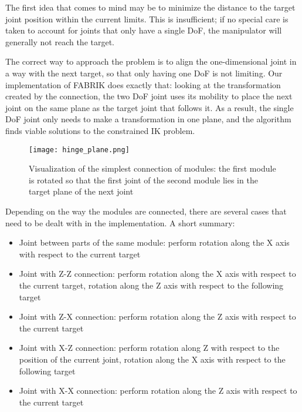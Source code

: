 The first idea that comes to mind may be to minimize the distance to the target joint position within the current limits. This is insufficient; if no special care is taken to account for joints that only have a single DoF, the manipulator will generally not reach the target.

The correct way to approach the problem is to align the one-dimensional joint in a way with the next target, so that only having one DoF is not limiting. Our implementation of FABRIK does exactly that: looking at the transformation created by the connection, the two DoF joint uses its mobility to place the next joint on the same plane as the target joint that follows it. As a result, the single DoF joint only needs to make a transformation in one plane, and the algorithm finds viable solutions to the constrained IK problem.

\begin{figure}[h]
    \centering
    \begin{minipage}{.6\textwidth}
        \texttt{[image: hinge\_plane.png]}
    \end{minipage}
    \caption{Visualization of the simplest connection of modules: the first module is rotated so that the first joint of the second module lies in the target plane of the next joint~\cite{Ondika2021thesis}}\label{fig:hinge}
\end{figure}

Depending on the way the modules are connected, there are several cases that need to be dealt with in the implementation. A short summary:

\begin{itemize}
  \item Joint between parts of the same module: perform rotation along the X axis with respect to the current target
  \item Joint with Z-Z connection: perform rotation along the X axis with respect to the current target, rotation along the Z axis with respect to the following target
  \item Joint with Z-X connection: perform rotation along the Z axis with respect to the current target
  \item Joint with X-Z connection: perform rotation along Z with respect to the position of the current joint, rotation along the X axis with respect to the following target
  \item Joint with X-X connection: perform rotation along the Z axis with respect to the current target
  \end{itemize}

